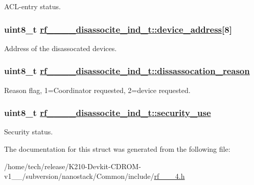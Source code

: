 ACL-entry status. \hypertarget{structrf__802__15__4__disassocite__ind__t_4c05ddc66f34dbd413ffede2dff8af78}{
\subsubsection[device\_\-address]{\setlength{\rightskip}{0pt plus 5cm}uint8\_\-t \hyperlink{structrf__802__15__4__disassocite__ind__t_4c05ddc66f34dbd413ffede2dff8af78}{rf\_\_\_\_\-disassocite\_\-ind\_\-t::device\_\-address}\mbox{[}8\mbox{]}}}
\label{structrf__802__15__4__disassocite__ind__t_4c05ddc66f34dbd413ffede2dff8af78}


Address of the disassocated devices. \hypertarget{structrf__802__15__4__disassocite__ind__t_3e3ee684fbf3997039fd244e72746c91}{
\subsubsection[dissassocation\_\-reason]{\setlength{\rightskip}{0pt plus 5cm}uint8\_\-t \hyperlink{structrf__802__15__4__disassocite__ind__t_3e3ee684fbf3997039fd244e72746c91}{rf\_\_\_\_\-disassocite\_\-ind\_\-t::dissassocation\_\-reason}}}
\label{structrf__802__15__4__disassocite__ind__t_3e3ee684fbf3997039fd244e72746c91}


Reason flag, 1=Coordinator requested, 2=device requested. \hypertarget{structrf__802__15__4__disassocite__ind__t_9cc973eea95551ccb75254d9eb3fd60a}{
\subsubsection[security\_\-use]{\setlength{\rightskip}{0pt plus 5cm}uint8\_\-t \hyperlink{structrf__802__15__4__disassocite__ind__t_9cc973eea95551ccb75254d9eb3fd60a}{rf\_\_\_\_\-disassocite\_\-ind\_\-t::security\_\-use}}}
\label{structrf__802__15__4__disassocite__ind__t_9cc973eea95551ccb75254d9eb3fd60a}


Security status. 

The documentation for this struct was generated from the following file:\begin{CompactItemize}
\item 
/home/tech/release/K210-Devkit-CDROM-v1\_\_/subversion/nanostack/Common/include/\hyperlink{rf__802__15__4_8h}{rf\_\_\_\-4.h}\end{CompactItemize}
